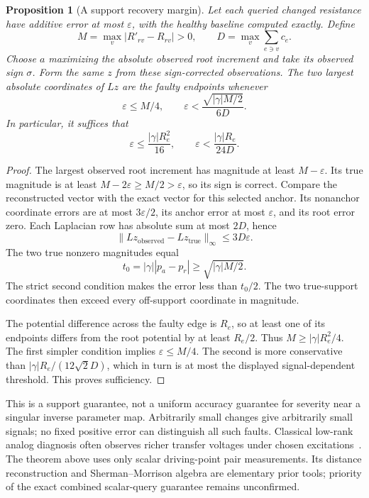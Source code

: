 \documentclass[11pt,letterpaper]{article}
\newtheorem{proposition}[theorem]{Proposition}
\begin{document}
\begin{proposition}[A support recovery margin]\label{prop:universalnoise}
Let each queried changed resistance have additive error at most $\varepsilon$, with the healthy baseline computed exactly. Define
\[
 M=\max_v|R'_{rv}-R_{rv}|>0,\qquad
 D=\max_v\sum_{e\ni v}c_e.
\]
Choose $a$ maximizing the absolute observed root increment and take its observed sign $\sigma$. Form the same $z$ from these sign-corrected observations. The two largest absolute coordinates of $Lz$ are the faulty endpoints whenever
\[
 \varepsilon\le M/4,\qquad
 \varepsilon<\frac{\sqrt{|\gamma|M/2}}{6D}.
\]
In particular, it suffices that
\[
 \varepsilon\le\frac{|\gamma|R_e^2}{16},
 \qquad
 \varepsilon<\frac{|\gamma|R_e}{24D}.
\]
\end{proposition}
\begin{proof}
The largest observed root increment has magnitude at least $M-\varepsilon$. Its true magnitude is at least $M-2\varepsilon\ge M/2>\varepsilon$, so its sign is correct. Compare the reconstructed vector with the exact vector for this selected anchor. Its nonanchor coordinate errors are at most $3\varepsilon/2$, its anchor error at most $\varepsilon$, and its root error zero. Each Laplacian row has absolute sum at most $2D$, hence
\[
 \|Lz_{\mathrm{observed}}-Lz_{\mathrm{true}}\|_\infty\le3D\varepsilon.
\]
The two true nonzero magnitudes equal
\[
 t_0=|\gamma||p_a-p_r|
 \ge\sqrt{|\gamma|M/2}.
\]
The strict second condition makes the error less than $t_0/2$. The two true-support coordinates then exceed every off-support coordinate in magnitude.

The potential difference across the faulty edge is $R_e$, so at least one of its endpoints differs from the root potential by at least $R_e/2$. Thus $M\ge|\gamma|R_e^2/4$. The first simpler condition implies $\varepsilon\le M/4$. The second is more conservative than $|\gamma|R_e/(12\sqrt2D)$, which in turn is at most the displayed signal-dependent threshold. This proves sufficiency.
\end{proof}

This is a support guarantee, not a uniform accuracy guarantee for severity near a singular inverse parameter map. Arbitrarily small changes give arbitrarily small signals; no fixed positive error can distinguish all such faults. Classical low-rank analog diagnosis often observes richer transfer voltages under chosen excitations~\cite{TK,LS}. The theorem above uses only scalar driving-point pair measurements. Its distance reconstruction and Sherman--Morrison algebra are elementary prior tools; priority of the exact combined scalar-query guarantee remains unconfirmed.
\end{document}

